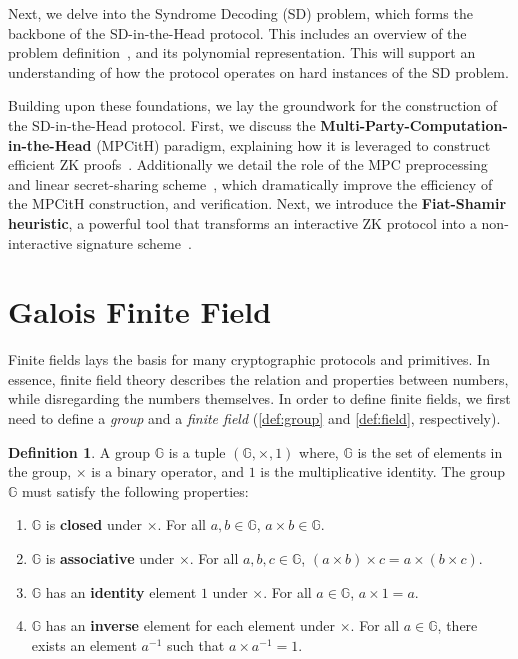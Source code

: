 \documentclass[twoside,11pt]{report}
\theoremstyle{definition}
\newtheorem{definition}{Definition}[section]
\theoremstyle{plain}
\begin{document}
Next, we delve into the Syndrome Decoding (SD) problem, which forms the backbone of the SD-in-the-Head protocol. This includes an overview of the problem definition~\cite{aguilarsyndrome11, mceliece1978public, berlekamp1978inherent, baldi2013optimization}, and its polynomial representation. This will support an understanding of how the protocol operates on hard instances of the SD problem.

Building upon these foundations, we lay the groundwork for the construction of the SD-in-the-Head protocol. First, we discuss the \textbf{Multi-Party-Computation-in-the-Head} (MPCitH) paradigm, explaining how it is leveraged to construct efficient ZK proofs~\cite{ishai2007zero}. Additionally we detail the role of the MPC preprocessing~\cite{baum2020concretely} and linear secret-sharing scheme~\cite{feneuil2023threshold}, which dramatically improve the efficiency of the MPCitH construction, and verification. Next, we introduce the \textbf{Fiat-Shamir heuristic}, a powerful tool that transforms an interactive ZK protocol into a non-interactive signature scheme~\cite{fiat1986prove}.

\section{Galois Finite Field}\label{sec:gf256}
Finite fields lays the basis for many cryptographic protocols and primitives. In essence, finite field theory describes the relation and properties between numbers, while disregarding the numbers themselves. In order to define finite fields, we first need to define a \textit{group} and a \textit{finite field} (\autoref{def:group} and \autoref{def:field}, respectively).

\begin{definition}\label{def:group}
  A group $\mathbb{G}$ is a tuple $(\mathbb{G}, \times, 1)$ where, $\mathbb{G}$ is the set of elements in the group, $\times$ is a binary operator, and $1$ is the multiplicative identity. The group $\mathbb{G}$ must satisfy the following properties:
  \begin{enumerate}
    \item $\mathbb{G}$ is \textbf{closed} under $\times$. For all $a,b \in \mathbb{G}$, $a \times b \in \mathbb{G}$.
    \item $\mathbb{G}$ is \textbf{associative} under $\times$. For all $a,b,c \in \mathbb{G}$, $(a \times b) \times c = a \times (b \times c)$.
    \item $\mathbb{G}$ has an \textbf{identity} element $1$ under $\times$. For all $a \in \mathbb{G}$, $a \times 1 = a$.
    \item $\mathbb{G}$ has an \textbf{inverse} element for each element under $\times$. For all $a \in \mathbb{G}$, there exists an element $a^{-1}$ such that $a \times a^{-1} = 1$.
  \end{enumerate}
\end{definition}
\end{document}

